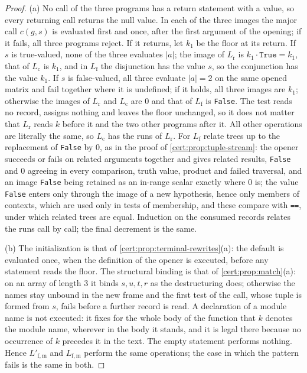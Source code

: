 \begin{proof}
(a) No call of the three programs has a return statement with a value, so every
returning call returns the null value. In each of the three images the major call
$c(g,s)$ is evaluated first and once, after the first argument of the opening; if
it fails, all three programs reject. If it returns, let $k_1$ be the floor at its
return. If $s$ is true-valued, none of the three evaluates $\lvert a\rvert$; the
image of $L_{\mathrm r}$ is $k_1\cdot\mathtt{True}=k_1$, that of $L_{\mathrm c}$
is $k_1$, and in $L_{\mathrm f}$ the disjunction has the value $s$, so the
conjunction has the value $k_1$. If $s$ is false-valued, all three evaluate
$\lvert a\rvert=2$ on the same opened matrix and fail together where it is
undefined; if it holds, all three images are $k_1$; otherwise the images of
$L_{\mathrm r}$ and $L_{\mathrm c}$ are $0$ and that of $L_{\mathrm f}$ is
\texttt{False}. The test reads no record, assigns nothing and leaves the floor
unchanged, so it does not matter that $L_{\mathrm r}$ reads $k$ before it and the
two other programs after it. All other operations are literally the same, so
$L_{\mathrm c}$ has the runs of $L_{\mathrm r}$. For $L_{\mathrm f}$ relate trees
up to the replacement of \texttt{False} by $0$, as in the proof of
\cref{cert:prop:tuple-stream}: the opener succeeds or fails on related arguments
together and gives related results, \texttt{False} and $0$ agreeing in every
comparison, truth value, product and failed traversal, and an image
\texttt{False} being retained as an in-range scalar exactly where $0$ is; the
value \texttt{False} enters only through the image of a new hypothesis, hence
only members of contexts, which are used only in tests of membership, and these
compare with \texttt{==}, under which related trees are equal. Induction on the
consumed records relates the runs call by call; the final decrement is the same.

(b) The initialization is that of \cref{cert:prop:terminal-rewrites}(a): the
default is evaluated once, when the definition of the opener is executed, before
any statement reads the floor. The structural binding is that of
\cref{cert:prop:match}(a): on an array of length $3$ it binds $s,u,t,r$ as the
destructuring does; otherwise the names stay unbound in the new frame and the
first test of the call, whose tuple is formed from $s$, fails before a further
record is read. A declaration of a module name is not executed: it fixes for the
whole body of the function that $k$ denotes the module name, wherever in the body
it stands, and it is legal there because no occurrence of $k$ precedes it in the
text. The empty statement performs nothing. Hence $L'_{\mathrm{f,m}}$ and
$L_{\mathrm{f,m}}$ perform the same operations; the case in which the pattern
fails is the same in both.


\end{proof}
